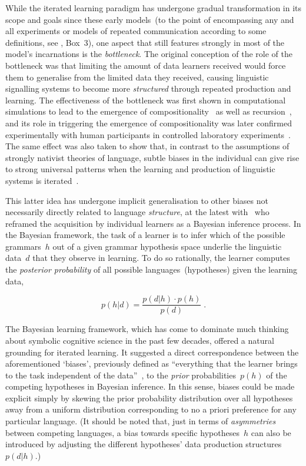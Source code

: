 While the iterated learning paradigm has undergone gradual transformation in its scope and goals since these early models~(to the point of encompassing any and all experiments or models of repeated communication according to some definitions, see \citealt{Scott-Phillips2010}, Box~3), one aspect that still features strongly in most of the model's incarnations is the \emph{bottleneck}.
The original conception of the role of the bottleneck was that limiting the amount of data learners received would force them to generalise from the limited data they received, causing linguistic signalling systems to become more \emph{structured} through repeated production and learning. The effectiveness of the bottleneck was first shown in computational simulations to lead to the emergence of compositionality~\citep{Kirby2000} as well as recursion~\citep{Kirby2002}, and its role in triggering the emergence of compositionality was later confirmed experimentally with human participants in controlled laboratory experiments~\citep[e.g.][]{Kirby2008,Cornish2009,Smith2010}.
The same effect was also taken to show that, in contrast to the assumptions of strongly nativist theories of language, subtle biases in the individual can give rise to strong universal patterns when the learning and production of linguistic systems is iterated~\citep{Kirby1999}.

This latter idea has undergone implicit generalisation to other biases not necessarily directly related to language \emph{structure}, at the latest with~\citet{Kirby2004} who reframed the acquisition by individual learners as a Bayesian inference process. In the Bayesian framework, the task of a learner is to infer which of the possible grammars~$h$ out of a given grammar hypothesis space underlie the linguistic data~$d$ that they observe in learning. To do so rationally, the learner computes the \emph{posterior probability} of all possible languages~(hypotheses) given the learning data,

\begin{equation}\label{eq:bayes}
p(h|d) = \frac{p(d|h) \cdot p(h)}{p(d)}\;.
\end{equation}

The Bayesian learning framework, which has come to dominate much thinking about symbolic cognitive science in the past few decades, offered a natural grounding for iterated learning. It suggested a direct correspondence between the aforementioned `biases', previously defined as ``everything that the learner brings to the task independent of the data''~\citep[p.590]{Kirby2004}, to the \emph{prior} probabilities~$p(h)$ of the competing hypotheses in Bayesian inference. In this sense, biases could be made explicit simply by skewing the prior probability distribution over all hypotheses away from a uniform distribution corresponding to no a priori preference for any particular language. (It should be noted that, just in terms of \emph{asymmetries} between competing languages, a bias towards specific hypotheses~$h$ can also be introduced by adjusting the different hypotheses' data production structures~$p(d|h)$.)

